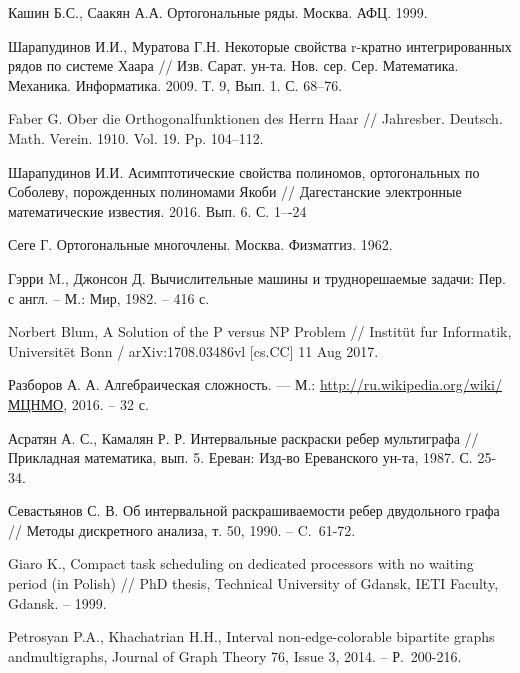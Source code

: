 \begin{thebibliography}{1}
{Кашин Б.С., Саакян А.А.}
Ортогональные ряды. Москва. АФЦ. 1999.




{Шарапудинов И.И., Муратова Г.Н.}
Некоторые свойства r-кратно интегрированных рядов по системе Хаара // Изв. Сарат. ун-та. Нов. сер. Сер. Математика. Механика. Информатика. 2009. Т. 9, Вып. 1. С. 68--76.




{Faber G.}
Ober die Orthogonalfunktionen des Herrn Haar // Jahresber. Deutsch. Math. Verein. 1910. Vol. 19. Pp. 104--112.

{Шарапудинов И.И.}
Асимптотические свойства полиномов, ортогональных по Соболеву, порожденных полиномами Якоби // Дагестанские электронные математические известия. 2016. Вып. 6. С. 1–-24

Сеге Г. Ортогональные многочлены. Москва. Физматгиз. 1962.













Гэрри M., Джонсон Д. Вычислительные машины и труднорешаемые задачи: Пер. с англ. – М.: Мир, 1982. – 416 с.

Norbert Blum, A Solution of the P versus NP Problem // Instit\"{u}t fur Informatik,
Universit\"{e}t Bonn / arXiv:1708.03486vl [cs.CC] 11 Aug 2017.

Разборов А. А. Алгебраическая сложность. — М.:
\href{http://ru.wikipedia.org/wiki/МЦНМО}{http://ru.wikipedia.org/wiki/МЦНМО}, 2016. – 32 с.

Асратян А. С., Камалян Р. Р. Интервальные раскраски ребер мультиграфа // Прикладная математика, вып. 5. Ереван:
Изд-во Ереванского ун-та, 1987. С. 25-34.

Севастьянов С. В. Об интервальной раскрашиваемости ребер двудольного графа // Методы дискретного анализа, т. 50,
1990. – C.~61-72.

Giaro K., Compact task scheduling on dedicated processors with no waiting period (in
Polish) // PhD thesis, Technical University of Gdansk, IETI Faculty, Gdansk. – 1999.

Petrosyan P.A., Khachatrian H.H., Interval non-edge-colorable bipartite graphs
andmultigraphs, Journal of Graph Theory 76, Issue 3, 2014. – Р.~200-216.


\end{thebibliography}
